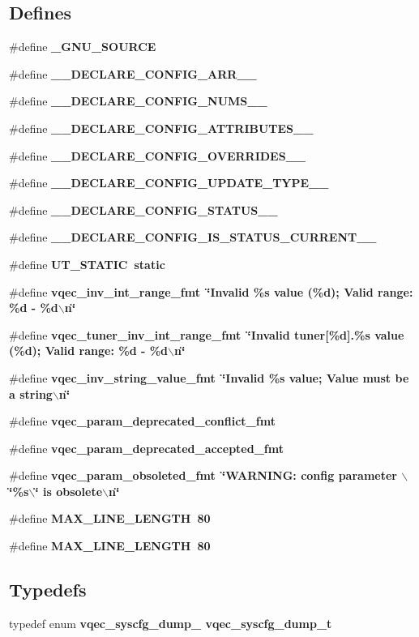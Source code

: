 \subsection*{Defines}
\begin{CompactItemize}
\item 
\#define \bf{\_\-GNU\_\-SOURCE}
\item 
\#define \bf{\_\-\_\-DECLARE\_\-CONFIG\_\-ARR\_\-\_\-}
\item 
\#define \bf{\_\-\_\-DECLARE\_\-CONFIG\_\-NUMS\_\-\_\-}
\item 
\#define \bf{\_\-\_\-DECLARE\_\-CONFIG\_\-ATTRIBUTES\_\-\_\-}
\item 
\#define \bf{\_\-\_\-DECLARE\_\-CONFIG\_\-OVERRIDES\_\-\_\-}
\item 
\#define \bf{\_\-\_\-DECLARE\_\-CONFIG\_\-UPDATE\_\-TYPE\_\-\_\-}
\item 
\#define \bf{\_\-\_\-DECLARE\_\-CONFIG\_\-STATUS\_\-\_\-}
\item 
\#define \bf{\_\-\_\-DECLARE\_\-CONFIG\_\-IS\_\-STATUS\_\-CURRENT\_\-\_\-}
\item 
\#define \bf{UT\_\-STATIC}~static
\item 
\#define \bf{vqec\_\-inv\_\-int\_\-range\_\-fmt}~\char`\"{}Invalid \%s value (\%d); Valid range: \%d - \%d$\backslash$n\char`\"{}
\item 
\#define \bf{vqec\_\-tuner\_\-inv\_\-int\_\-range\_\-fmt}~\char`\"{}Invalid tuner[\%d].\%s value (\%d); Valid range: \%d - \%d$\backslash$n\char`\"{}
\item 
\#define \bf{vqec\_\-inv\_\-string\_\-value\_\-fmt}~\char`\"{}Invalid \%s value; Value must be a string$\backslash$n\char`\"{}
\item 
\#define \bf{vqec\_\-param\_\-deprecated\_\-conflict\_\-fmt}
\item 
\#define \bf{vqec\_\-param\_\-deprecated\_\-accepted\_\-fmt}
\item 
\#define \bf{vqec\_\-param\_\-obsoleted\_\-fmt}~\char`\"{}WARNING: config parameter $\backslash$\char`\"{}\%s$\backslash$\char`\"{} is obsolete$\backslash$n\char`\"{}
\item 
\#define \bf{MAX\_\-LINE\_\-LENGTH}~80
\item 
\#define \bf{MAX\_\-LINE\_\-LENGTH}~80
\end{CompactItemize}
\subsection*{Typedefs}
\begin{CompactItemize}
\item 
typedef enum \bf{vqec\_\-syscfg\_\-dump\_\-} \bf{vqec\_\-syscfg\_\-dump\_\-t}
\end{CompactItemize}
